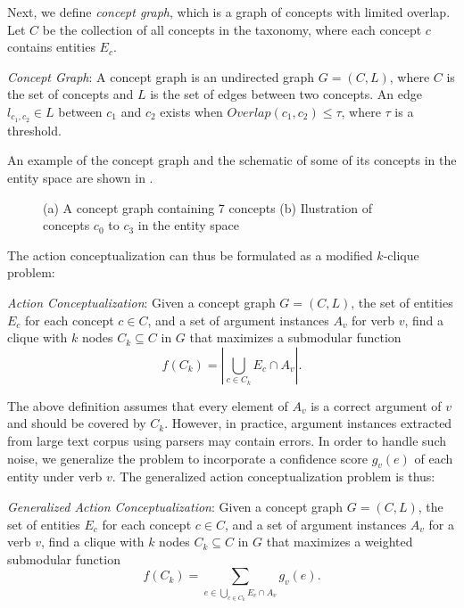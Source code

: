 Next, we define \emph{concept graph}, which is a graph of concepts
with limited overlap.
Let $C$ be the collection of all concepts in the taxonomy,
where each concept $c$ contains entities $E_c$.
\begin{definition}
\emph{Concept Graph}: A concept graph is an
undirected graph $G=(C,L)$, where
$C$ is the set of concepts and $L$ is the set of edges between
two concepts. An edge $l_{c_1,c_2}\in L$ between $c_1$ and $c_2$ exists when
$Overlap(c_1, c_2)\leq\tau$, where $\tau$ is a threshold.
\end{definition}

An example of the concept graph and the schematic of
some of its concepts in the entity space are shown in .
\begin{figure}[th]
\centering
{}
\caption{(a) A concept graph containing 7 concepts
(b) Ilustration of concepts $c_0$ to $c_3$ in the entity space}
\label{fig:graph_model}
\end{figure}

The action conceptualization can thus be formulated as a
modified $k$-clique problem:
\begin{definition}
\emph{Action Conceptualization}: Given a concept graph $G=(C,L)$,
the set of entities $E_c$ for each concept $c\in C$,
and a set of argument instances $A_v$ for verb $v$,
find a clique with $k$ nodes $C_k\subseteq C$
in $G$ that maximizes a submodular function
\begin{equation}
f(C_k)=|\bigcup_{c\in C_k}{E_c}\cap A_v|.
\end{equation}
\end{definition}

The above definition assumes that every element of $A_v$ is a correct argument
of $v$ and should be covered by $C_k$.
However, in practice, argument instances extracted from large text corpus
using parsers may contain errors. In order to handle such noise,
we generalize the problem to incorporate a confidence score $g_v(e)$
of each entity under verb $v$.
The generalized action conceptualization problem is thus:
\begin{definition}
\label{def:acw}
\emph{Generalized Action Conceptualization}: Given a concept graph $G=(C,L)$,
the set of entities $E_c$ for each concept $c\in C$,
and a set of argument instances $A_v$ for a verb $v$, find a clique
with $k$ nodes $C_k\subseteq C$
in $G$ that maximizes a weighted submodular function
\begin{equation}
f(C_k)=\sum_{e\in \bigcup_{c\in C_k}{E_c}\cap A_v}{g_v(e)}.
\label{eq:f}
\end{equation}
\end{definition}


